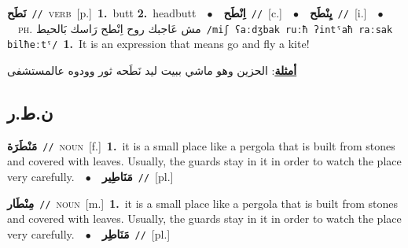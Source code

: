 \documentclass[10pt,a4paper,twoside]{article} %
\begin{document}
\begin{multicols}{2}
{\setlength\topsep{0pt}\textbf{\foreignlanguage{arabic}{نَطَح}}\ {\color{gray}\texttt{//}\color{black}}\ \textsc{verb}\ [p.]\ \textbf{1.}~butt  \textbf{2.}~headbutt\ \ $\bullet$\ \ \setlength\topsep{0pt}\textbf{\foreignlanguage{arabic}{اِنْطَح}}\ {\color{gray}\texttt{//}\color{black}}\ [c.]\ \ $\bullet$\ \ \setlength\topsep{0pt}\textbf{\foreignlanguage{arabic}{يِنْطَح}}\ {\color{gray}\texttt{//}\color{black}}\ [i.]\ \ $\bullet$\ \ \textsc{ph.} \color{gray} \foreignlanguage{arabic}{مش عَاجبك روح اِنْطح رَاسك بَالحيط}\color{black}\ {\color{gray}\texttt{/{\sffamily miʃ ʕaːdʒbak ruːħ ʔintˤaħ raːsak bilħeːtˤ}/}\color{black}}\ \textbf{1.}~It is an expression that means go and fly a kite!\  \begin{flushright}\color{gray}\foreignlanguage{arabic}{\textbf{\underline{\foreignlanguage{arabic}{أمثلة}}}: الحزين وهو ماشي ببيت ليد نَطَحه ثور وودوه عالمستشفى}\end{flushright}\color{black}} \vspace{2mm}

\vspace{-3mm}
\subsection*{\color{blue}\foreignlanguage{arabic}{ن.ط.ر}\color{blue}{}} 

{\setlength\topsep{0pt}\textbf{\foreignlanguage{arabic}{مَنْطَرَة}}\ {\color{gray}\texttt{//}\color{black}}\ \textsc{noun}\ [f.]\ \textbf{1.}~it is a small place like a pergola that is built from stones and covered with leaves. Usually, the guards stay in it in order to watch the place very carefully.\ \ $\bullet$\ \ \setlength\topsep{0pt}\textbf{\foreignlanguage{arabic}{مَنَاطِير}}\ {\color{gray}\texttt{//}\color{black}}\ [pl.]\ } \vspace{2mm}

{\setlength\topsep{0pt}\textbf{\foreignlanguage{arabic}{مِنْطَار}}\ {\color{gray}\texttt{//}\color{black}}\ \textsc{noun}\ [m.]\ \textbf{1.}~it is a small place like a pergola that is built from stones and covered with leaves. Usually, the guards stay in it in order to watch the place very carefully.\ \ $\bullet$\ \ \setlength\topsep{0pt}\textbf{\foreignlanguage{arabic}{مَنَاطِر}}\ {\color{gray}\texttt{//}\color{black}}\ [pl.]\ } \vspace{2mm}


\end{multicols}
\end{document}
